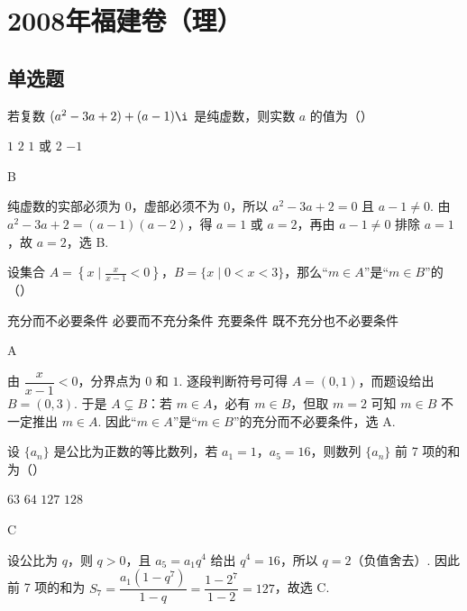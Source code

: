 \chapter{2008年福建卷（理）}

\section{单选题}

\begin{problem}
若复数 \((a^2 - 3a + 2) + (a - 1)\i\) 是纯虚数，则实数 \(a\) 的值为（\quad）

\choices
    {\(1\)}
    {\(2\)}
    {\(1\) 或 \(2\)}
    {\(-1\)}
\begin{answer}
B
\end{answer}
\begin{solution}
纯虚数的实部必须为 \(0\)，虚部必须不为 \(0\)，所以
\(a^{2}-3a+2=0\) 且 \(a-1\neq0\). 由
\(a^{2}-3a+2=(a-1)(a-2)\)，得 \(a=1\) 或 \(a=2\)，再由 \(a-1\neq0\) 排除 \(a=1\)，故 \(a=2\)，选 B.
\end{solution}
\end{problem}

\begin{problem}
设集合 \(A = \left\{x \mid \frac{x}{x - 1} < 0\right\}\)，\(B = \{x \mid 0 < x < 3\}\)，那么“\(m \in A\)”是“\(m \in B\)”的（\quad）

\choices
    {充分而不必要条件}
    {必要而不充分条件}
    {充要条件}
    {既不充分也不必要条件}
\begin{answer}
A
\end{answer}
\begin{solution}
由 \(\dfrac{x}{x-1}<0\)，分界点为 \(0\) 和 \(1\). 逐段判断符号可得
\(A=(0,1)\)，而题设给出 \(B=(0,3)\). 于是 \(A\subsetneq B\)：若 \(m\in A\)，必有 \(m\in B\)，但取 \(m=2\) 可知 \(m\in B\) 不一定推出 \(m\in A\). 因此“\(m\in A\)”是“\(m\in B\)”的充分而不必要条件，选 A.
\end{solution}
\end{problem}

\begin{problem}
设 \(\{a_n\}\) 是公比为正数的等比数列，若 \(a_1 = 1\)，\(a_5 = 16\)，则数列 \(\{a_n\}\) 前 7 项的和为（\quad）

\choices
    {\(63\)}
    {\(64\)}
    {\(127\)}
    {\(128\)}
\begin{answer}
C
\end{answer}
\begin{solution}
设公比为 \(q\)，则 \(q>0\)，且 \(a_5=a_1q^4\) 给出 \(q^4=16\)，所以 \(q=2\)（负值舍去）. 因此前 7 项的和为 \(S_7=\dfrac{a_1(1-q^7)}{1-q}=\dfrac{1-2^7}{1-2}=127\)，故选 C.
\end{solution}
\end{problem}

